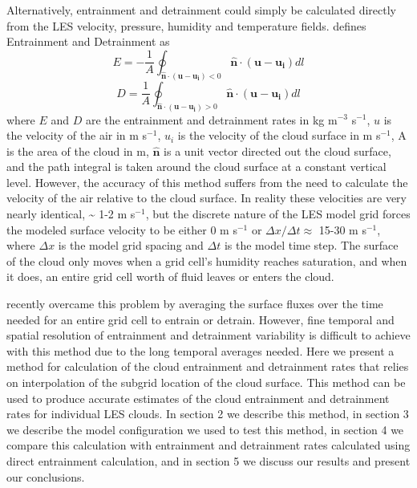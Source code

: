 \documentclass[12pt]{article}
\begin{document}
Alternatively, entrainment and detrainment could simply be calculated directly 
from the LES velocity, pressure, humidity and temperature fields.  
\cite{Siebesma1998} defines Entrainment and Detrainment as
\begin{equation}
E = -\frac{1}{A}\oint_{\mathbf{\hat{n}}\cdot(\mathbf{u} - \mathbf{u_i}) < 0}
\mathbf{\hat{n}}\cdot(\mathbf{u}-\mathbf{u_i})dl
\end{equation}
\begin{equation}
D = \frac{1}{A}\oint_{\mathbf{\hat{n}}\cdot(\mathbf{u} - \mathbf{u_i}) > 0}
\mathbf{\hat{n}}\cdot(\mathbf{u}-\mathbf{u_i})dl
\end{equation}
where $E$ and $D$ are the entrainment and detrainment rates in kg m$^{-3}$ 
s$^{-1}$, $u$ is the velocity of the air in m s$^{-1}$, $u_i$ is the velocity 
of the cloud surface in m s$^{-1}$, A is the area of the cloud in m,
$\mathbf{\hat{n}}$ is a unit vector directed out the cloud surface, and the 
path integral is taken around the cloud surface at a constant vertical level.
However, the accuracy of this method suffers from the need to calculate the 
velocity of the air relative to the cloud surface.  In reality these velocities 
are very nearly identical, \textasciitilde{} 1-2 m s$^{-1}$, but the discrete 
nature of the LES model grid forces the modeled surface velocity to be either 
0 m s$^{-1}$ or $\Delta x / \Delta t \approx$ 15-30 m s$^{-1}$, where 
$\Delta x$ is the model grid spacing and $\Delta t$ is the model time step.  The
surface of the cloud only moves when a grid cell's humidity reaches saturation, 
and when it does, an entire grid cell worth of fluid leaves or enters the cloud.

\cite{Romps2010} recently overcame this problem by averaging the surface 
fluxes over the time needed for an entire grid cell to entrain or detrain.
However, fine temporal and spatial resolution of entrainment and detrainment 
variability is difficult to achieve with this method due to the long temporal 
averages needed.  Here we present a method for calculation of the cloud 
entrainment and detrainment rates that relies on interpolation of the subgrid 
location of the cloud surface.  This method can be used to produce accurate 
estimates of the cloud entrainment and detrainment rates for individual LES 
clouds.  In section 2 we describe this method, in section 3 we describe the 
model configuration we used to test this method, in section 4 we compare this 
calculation with entrainment and detrainment rates calculated using 
\cite{Romps2010} direct entrainment calculation, and in section 5 we discuss 
our results and present our conclusions.  
\end{document}
